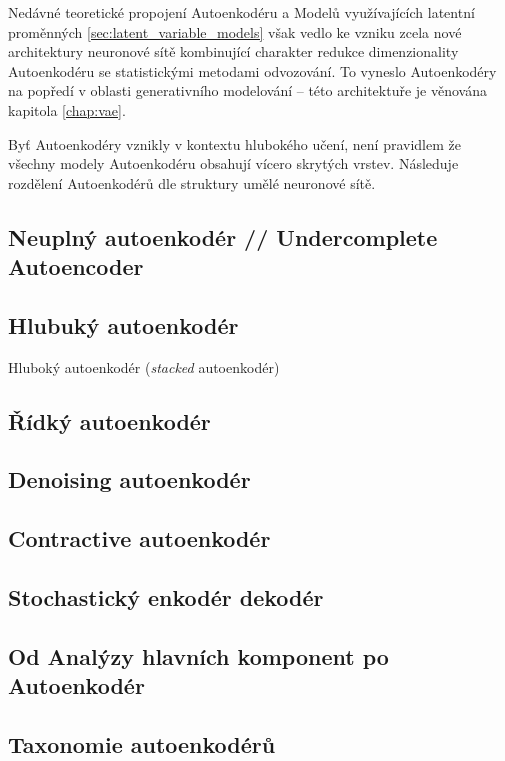 Nedávné teoretické propojení Autoenkodéru a Modelů využívajících latentní proměnných \autoref{sec:latent_variable_models} však vedlo ke vzniku zcela nové architektury neuronové sítě kombinující charakter redukce dimenzionality Autoenkodéru se statistickými metodami odvozování.
To vyneslo Autoenkodéry na popředí v oblasti generativního modelování – této architektuře je věnována kapitola \autoref{chap:vae}.

Byť Autoenkodéry vznikly v kontextu hlubokého učení, není pravidlem že všechny modely Autoenkodéru obsahují vícero skrytých vrstev. Následuje rozdělení Autoenkodérů dle struktury umělé neuronové sítě.


\subsection{Neuplný autoenkodér // Undercomplete Autoencoder}

\subsection{Hlubuký autoenkodér}
Hluboký autoenkodér (\emph{stacked} autoenkodér)


\subsection{Řídký autoenkodér}

\subsection{Denoising autoenkodér}
\subsection{Contractive autoenkodér}

\subsection{Stochastický enkodér dekodér}


\subsection{Od Analýzy hlavních komponent po Autoenkodér}

\subsection{Taxonomie autoenkodérů}